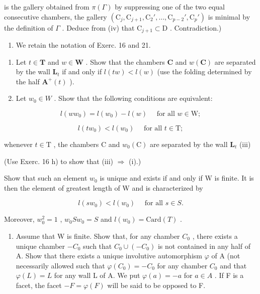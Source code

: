 is the gallery obtained from \(\pi(\Gamma)\) by suppressing one of the two equal consecutive chambers, the gallery \((\mathrm{C}_{j}, \mathrm{C}_{j+1}, \mathrm{C}_{2}', \ldots, \mathrm{C}_{p-2}', \mathrm{C}_{p}')\) is minimal by the definition of \(\Gamma\) . Deduce from (iv) that \(\mathrm{C}_{j+1} \subset \mathrm{D}\) . Contradiction.)

\begin{enumerate}
\def\labelenumi{\arabic{enumi})}
\setcounter{enumi}{21}
\tightlist
\item
  We retain the notation of Exerc. 16 and 21.
\end{enumerate}

\begin{enumerate}
\def\labelenumi{\alph{enumi})}
\item
  Let \(t \in \mathbf{T}\) and \(w \in \mathbf{W}\) . Show that the chambers \(\mathbf{C}\) and \(w(\mathbf{C})\) are separated by the wall \(\mathbf{L}_t\) if and only if \(l(tw) < l(w)\) (use the folding determined by the half \(\mathbf{A}^+(t)\) ).
\item
  Let \(w_0 \in W\) . Show that the following conditions are equivalent:
\end{enumerate}

\[
l (w w _ {0}) = l (w _ {0}) - l (w) \quad \text {   for   all   } w \in \mathrm{W};\tag{i}
\]

\[
l (t w _ {0}) <   l (w _ {0}) \quad \text {   for   all   } t \in \mathrm{T};\tag{ii}
\]

whenever \(t \in \mathrm{T}\) , the chambers \(\mathrm{C}\) and \(w_0(\mathrm{C})\) are separated by the wall \(\mathbf{L}_t\) (iii)

(Use Exerc. 16 h) to show that (iii) \(\Longrightarrow\) (i).)

Show that such an element \(w_{0}\) is unique and exists if and only if W is finite. It is then the element of greatest length of W and is characterized by

\[
l (s w _ {0}) <   l (w _ {0}) \quad \text {   for   all   } s \in S.\tag{iv}
\]

Moreover, \(w_0^2 = 1\) , \(w_0Sw_0 = S\) and \(l(w_0) = \mathrm{Card}(T)\) .

\begin{enumerate}
\def\labelenumi{(\alph{enumi})}
\setcounter{enumi}{2}
\tightlist
\item
  Assume that W is finite. Show that, for any chamber \(C_{0}\) , there exists a unique chamber \(-C_{0}\) such that \(C_{0} \cup (-C_{0})\) is not contained in any half of A. Show that there exists a unique involutive automorphism \(\varphi\) of A (not necessarily allowed such that \(\varphi(C_{0}) = -C_{0}\) for any chamber \(C_{0}\) and that \(\varphi(L) = L\) for any wall L of A. We put \(\varphi(a) = -a\) for \(a \in A\) . If F is a facet, the facet \(-F = \varphi(F)\) will be said to be opposed to F.
\end{enumerate}

